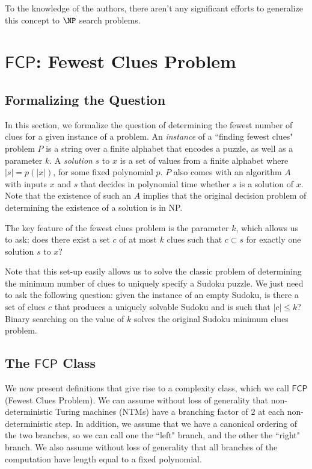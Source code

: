 \documentclass[runningheads,a4paper]{llncs}
\begin{document}
To the knowledge of the authors, there aren't any significant efforts to generalize this concept to $\NP$ search problems. 

\section{$\mathsf{FCP}$: Fewest Clues Problem}
\label{sec:prelim}

\subsection{Formalizing the Question}

In this section, we formalize the question of determining the fewest number of clues for a given instance of a problem. An \emph{instance} of a ``finding fewest clues" problem $P$ is a string over a finite alphabet that encodes a puzzle, as well as a parameter $k$. A \emph{solution} $s$ to $x$ is a set of values from a finite alphabet where $|s| = p(|x|)$, for some fixed polynomial $p$. $P$ also comes with an algorithm $A$ with inputs $x$ and $s$ that decides in polynomial time whether $s$ is a solution of $x$. Note that the existence of such an $A$ implies that the original decision problem of determining the existence of a solution is in NP.

The key feature of the fewest clues problem is the parameter $k$, which allows us to ask: does there exist a set $c$ of at most $k$ clues such that $c \subset s$ for exactly one solution $s$ to $x$?

Note that this set-up easily allows us to solve the classic problem of determining the minimum number of clues to uniquely specify a Sudoku puzzle. We just need to ask the following question: given the instance of an empty Sudoku, is there a set of clues $c$ that produces a uniquely solvable Sudoku and is such that $|c| \leq k$? Binary searching on the value of $k$ solves the original Sudoku minimum clues problem.

\subsection{The $\mathsf{FCP}$ Class}

We now present definitions that give rise to a complexity class, which we call  $\mathsf{FCP}$ (Fewest Clues Problem). We can assume without loss of generality that non-deterministic Turing machines (NTMs) have a branching factor of $2$ at each non-deterministic step. In addition, we assume that we have a canonical ordering of the two branches, so we can call one the ``left" branch, and the other the ``right" branch. We also assume without loss of generality that all branches of the computation have length equal to a fixed polynomial.
\end{document}
